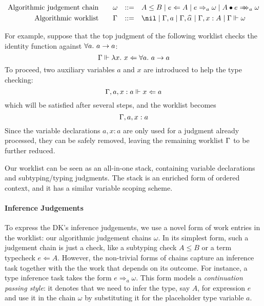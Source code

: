 $$\begin{aligned}
\text{Algorithmic judgement chain}\qquad&\jg &::=&\quad A \le B \mid e\Lto A \mid e\To_{a} \jg \mid \appInfAlg{A}{e}\\
\text{Algorithmic worklist}\qquad&\Gm &::=&\quad \nil \mid \Gm, a \mid \Gm, \al \mid \Gm, x: A \mid \Gm \Vdash \jg\\
\end{aligned}$$

For example, suppose that the top judgment of the following worklist
checks the identity function against $\all a \to a$:
$$\Gm \Vdash \lam x \Lto \all a \to a$$
To proceed, two auxiliary variables $a$ and $x$ are introduced to help the type checking:
$$\Gamma, a, x:a \Vdash x \Leftarrow a$$
which will be satisfied after several steps, and the worklist becomes
$$\Gamma, a, x:a$$
Since the variable declarations $a, x:a$ are only used for a judgment already processed,
they can be safely removed, leaving the remaining worklist $\Gamma$ to be further reduced.

Our worklist can be seen as an all-in-one stack,
containing variable declarations and subtyping/typing judgments.
The stack is an enriched form of ordered context,
and it has a similar variable scoping scheme.


\paragraph{Inference Judgements}
To express the DK's inference judgements, we use a novel form of work entries in
the worklist: our algorithmic judgement chains $\omega$. In its simplest form,
such a judgement chain is just a check, like a subtyping check $A \leq B$ or a
term typecheck $e \Leftarrow A$. 
However, the non-trivial forms of chains capture an
inference task together with the the work that depends on its outcome. For
instance, a type inference task takes the form $e \Rightarrow_a \omega$.
This form models a \emph{continuation passing style}:
it
denotes that we need to infer the type, say $A$, for expression $e$ and use it
in the chain $\omega$ by substituting it for the placeholder type variable $a$.

